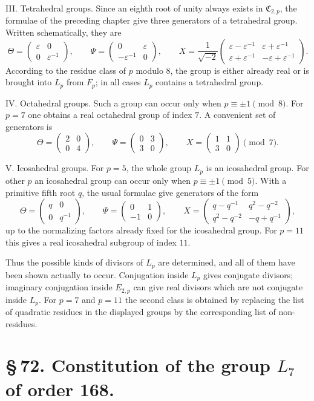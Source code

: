 \documentclass[11pt]{article}
\providecommand{\mat}[4]{\begin{pmatrix}#1&#2\\#3&#4\end{pmatrix}}
\providecommand{\mat}[4]{\begin{pmatrix}#1&#2\\#3&#4\end{pmatrix}}
\providecommand{\Cfield}{\mathfrak C}
\providecommand{\mat}[1]{\begin{pmatrix}#1\end{pmatrix}}
\begin{document}
III. Tetrahedral groups. Since an eighth root of unity always exists in $\Cfield_{2,p}$, the formulae of the preceding chapter give three generators of a tetrahedral group. Written schematically, they are
\begin{equation}
 \Theta=\mat{\varepsilon}{0}{0}{\varepsilon^{-1}},
 \qquad
 \Psi=\mat{0}{\varepsilon}{-\varepsilon^{-1}}{0},
 \qquad
 X=\frac{1}{\sqrt{-2}}\mat{\varepsilon-\varepsilon^{-1}}{\varepsilon+\varepsilon^{-1}}{\varepsilon+\varepsilon^{-1}}{-\varepsilon+\varepsilon^{-1}}.
 \tag{6}
\end{equation}
According to the residue class of $p$ modulo $8$, the group is either already real or is brought into $L_p$ from $F_p$; in all cases $L_p$ contains a tetrahedral group.

IV. Octahedral groups. Such a group can occur only when $p\equiv\pm1\pmod8$. For $p=7$ one obtains a real octahedral group of index $7$. A convenient set of generators is
\begin{equation}
 \Theta=\mat{2}{0}{0}{4},
 \qquad
 \Psi=\mat{0}{3}{3}{0},
 \qquad
 X=\mat{1}{1}{3}{0}\pmod7.
 \tag{7}
\end{equation}

V. Icosahedral groups. For $p=5$, the whole group $L_p$ is an icosahedral group. For other $p$ an icosahedral group can occur only when $p\equiv\pm1\pmod5$. With a primitive fifth root $q$, the usual formulae give generators of the form
\begin{equation}
 \Theta=\mat{q}{0}{0}{q^{-1}},
 \qquad
 \Psi=\mat{0}{1}{-1}{0},
 \qquad
 X=\mat{q-q^{-1}}{q^2-q^{-2}}{q^2-q^{-2}}{-q+q^{-1}},
 \tag{8}
\end{equation}
up to the normalizing factors already fixed for the icosahedral group. For $p=11$ this gives a real icosahedral subgroup of index $11$.

Thus the possible kinds of divisors of $L_p$ are determined, and all of them have been shown actually to occur. Conjugation inside $L_p$ gives conjugate divisors; imaginary conjugation inside $E_{2,p}$ can give real divisors which are not conjugate inside $L_p$. For $p=7$ and $p=11$ the second class is obtained by replacing the list of quadratic residues in the displayed groups by the corresponding list of non-residues.

\section*{\S\,72. Constitution of the group $L_7$ of order 168.}
\end{document}
